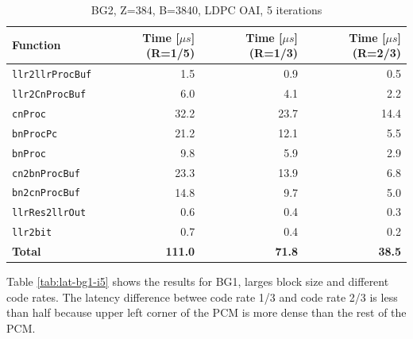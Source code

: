 \documentclass{article}
\begin{document}
\begin{table}[ht]
  \centering
  \begin{tabular}{lrrr}
    \toprule
    \textbf{Function} & \textbf{Time [$\mu s$] (R=1/5)} & \textbf{Time [$\mu s$] (R=1/3)} & \textbf{Time [$\mu s$] (R=2/3)}\\
    \midrule
    \texttt{llr2llrProcBuf} & 1.5  & 0.9  & 0.5  \\
    \texttt{llr2CnProcBuf}  & 6.0  & 4.1  & 2.2  \\
    \texttt{cnProc}         & 32.2 & 23.7 & 14.4 \\
    \texttt{bnProcPc}       & 21.2 & 12.1 & 5.5  \\
    \texttt{bnProc}         & 9.8  & 5.9  & 2.9  \\
    \texttt{cn2bnProcBuf}   & 23.3 & 13.9 & 6.8  \\
    \texttt{bn2cnProcBuf}   & 14.8 & 9.7  & 5.0  \\
    \texttt{llrRes2llrOut}  & 0.6  & 0.4  & 0.3  \\
    \texttt{llr2bit}        & 0.7  & 0.4  & 0.2  \\
    \midrule
    \textbf{Total}          & \textbf{111.0} & \textbf{71.8} & \textbf{38.5} \\
    \bottomrule
  \end{tabular}
  \caption{BG2, Z=384, B=3840, LDPC OAI, 5 iterations}
  \label{tab:lat-bg2-i5}
\end{table}

Table \ref{tab:lat-bg1-i5} shows the results for BG1, larges block size and different code rates. The latency difference betwee code rate 1/3 and code rate 2/3 is less than half because upper left corner of the PCM is more dense than the rest of the PCM.
\end{document}
